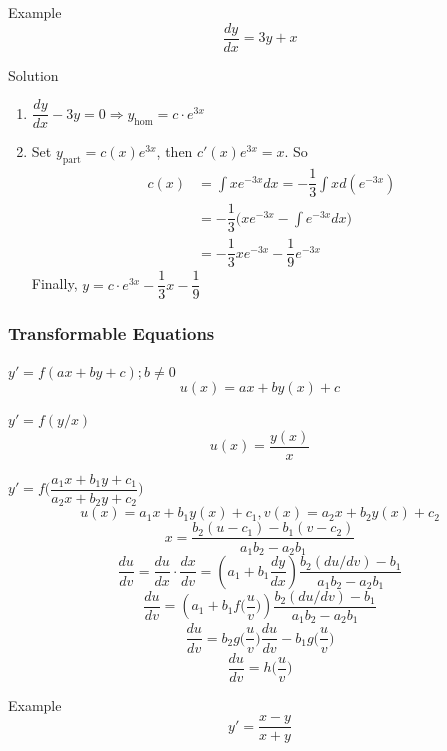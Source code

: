 \documentclass{beamer}
\begin{document}
\begin{frame}
\begin{block}{Example}
$$\dfrac{dy}{dx}=3y+x$$
\end{block}
\end{frame}

\begin{frame}
\begin{block}{Solution}
\begin{enumerate}
\item $\dfrac{dy}{dx}-3y=0\Rightarrow y_{\text{hom}}=c\cdot e^{3x}$
\item Set $y_{\text{part}}=c(x)e^{3x}$, then $c'(x)e^{3x}=x$. So
\begin{align*}
c(x)&=\int xe^{-3x}dx=-\dfrac{1}{3}\int xd(e^{-3x})\\
&=-\dfrac{1}{3}\Big(xe^{-3x}-\int e^{-3x}dx\Big)\\
&=-\dfrac{1}{3}xe^{-3x}-\dfrac{1}{9}e^{-3x}
\end{align*}
Finally, $y=c\cdot e^{3x}-\dfrac{1}{3}x-\dfrac{1}{9}$
\end{enumerate}
\end{block}
\end{frame}

\begin{frame}
\frametitle{Transformable Equations}
\begin{block}{$y'=f(ax+by+c);b\neq0$}
$$u(x)=ax+by(x)+c$$
\end{block}
\begin{block}{$y'=f(y/x)$}
$$u(x)=\dfrac{y(x)}{x}$$
\end{block}
\end{frame}

\begin{frame}
\begin{block}{$y'=f\Big(\dfrac{a_1x+b_1y+c_1}{a_2x+b_2y+c_2}\Big)$}
$$u(x)=a_1x+b_1y(x)+c_1,v(x)=a_2x+b_2y(x)+c_2$$
$$x=\dfrac{b_2(u-c_1)-b_1(v-c_2)}{a_1b_2-a_2b_1}$$
$$\dfrac{du}{dv}=\dfrac{du}{dx}\cdot\dfrac{dx}{dv}=(a_1+b_1\dfrac{dy}{dx})\dfrac{b_2(du/dv)-b_1}{a_1b_2-a_2b_1}$$
$$\dfrac{du}{dv}=(a_1+b_1f\Big(\dfrac{u}{v}\Big))\dfrac{b_2(du/dv)-b_1}{a_1b_2-a_2b_1}$$
$$\dfrac{du}{dv}=b_2g\Big(\dfrac{u}{v}\Big)\dfrac{du}{dv}-b_1g\Big(\dfrac{u}{v}\Big)$$
$$\dfrac{du}{dv}=h\Big(\dfrac{u}{v}\Big)$$
\end{block}
\end{frame}

\begin{frame}
\begin{block}{Example}
$$y'=\dfrac{x-y}{x+y}$$
\end{block}
\end{frame}
\end{document}
